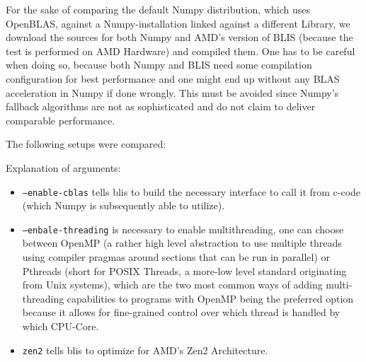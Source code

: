 \documentclass[english,11pt,a4paper,table]{article} %
\begin{document}
For the sake of comparing the default Numpy distribution, which uses OpenBLAS, against a Numpy-installation linked against a different Library,
we download the sources for both Numpy and AMD's version of BLIS (because the test is performed on AMD Hardware) and compiled them.
One has to be careful when doing so, because both Numpy and BLIS need some compilation configuration for best performance and one might end up without any BLAS acceleration in Numpy if done wrongly.
This must be avoided since Numpy's fallback algorithms are not as sophisticated and do not claim to deliver comparable performance.

The following setups were compared:


Explanation of arguments:
\begin{itemize}
	\item \texttt{--enable-cblas} tells blis to build the necessary interface to call it from c-code (which Numpy is subsequently able to utilize).
	\item \texttt{--enbale-threading} is necessary to enable multithreading, one can choose between OpenMP \cite{OpenMP} (a rather high level abstraction to use multiple threads using compiler pragmas around sections that can be run in parallel)
	      or Pthreads \cite{pthreads} (short for POSIX Threads, a more-low level standard originating from Unix systems), which are the two most common ways of adding multi-threading capabilities to programs with OpenMP being the preferred option because it allows for fine-grained control over which thread is handled by which CPU-Core.
	\item \texttt{zen2} tells blis to optimize for AMD's Zen2 Architecture.
\end{itemize}
\end{document}
